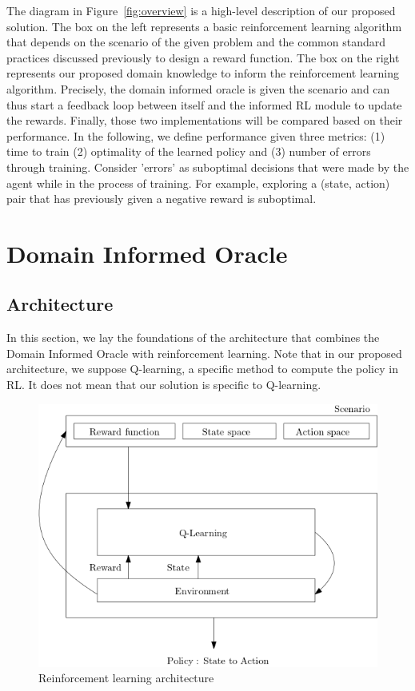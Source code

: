 \documentclass[a4paper,11pt]{article}
\theoremstyle{definition}
\begin{document}
The diagram in Figure~\ref{fig:overview} is a high-level description of our proposed solution. 
%
The box on the left represents a basic reinforcement learning algorithm that depends on the scenario of the given problem and 
the common standard practices discussed previously to design a reward function. 
%
The box on the right represents our proposed domain knowledge to inform the reinforcement learning algorithm. 
Precisely, the domain informed oracle is given the scenario and can thus start a feedback loop between itself and 
the informed RL module to update the rewards. 
%
Finally, those two implementations will be compared based on their performance. In the following, we define performance 
given three metrics: (1) time to train (2) optimality of the learned policy and (3) number of errors through training. 
Consider 'errors' as suboptimal decisions that were made by the agent while in the process of training. For example, exploring a (state, action) pair 
that has previously given a negative reward is suboptimal. 

\section{Domain Informed Oracle} 
\subsection{Architecture}
In this section, we lay the foundations of the architecture that combines the Domain Informed Oracle with 
reinforcement learning. Note that in our proposed architecture, we suppose Q-learning, a specific method to compute the policy in RL. 
It does not mean that our solution is specific to Q-learning. 

\medskip 

\begin{figure}[H]
  \centering
  \includegraphics[scale=0.41]{basicrl.png}
  \caption{Reinforcement learning architecture}
  \label{fig:basicrl}
\end{figure}
\end{document}
